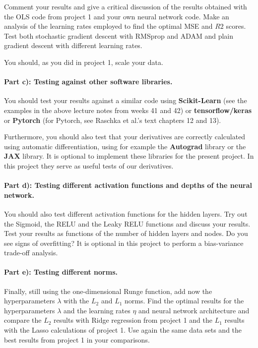 \documentclass[%
oneside,                 %
final,                   %
10pt]{article}
\begin{document}
Comment your results and give a critical discussion of the results
obtained with the OLS code from project 1 and your own neural network
code.  Make an analysis of the learning rates employed to find the
optimal MSE and $R2$ scores. Test both stochastic gradient descent
with RMSprop and ADAM and plain gradient descent with different
learning rates.

You should, as you did in project 1, scale your data.

\paragraph{Part c): Testing against other software libraries.}
You should test your results against a similar code using \textbf{Scikit-Learn} (see the examples in the above lecture notes from weeks 41 and 42) or \textbf{tensorflow/keras} or \textbf{Pytorch} (for Pytorch, see Raschka et al.'s text chapters 12 and 13). 

Furthermore, you should also test that your derivatives are correctly
calculated using automatic differentiation, using for example the
\textbf{Autograd} library or the \textbf{JAX} library. It is optional to implement
these libraries for the present project. In this project they serve as
useful tests of our derivatives.

\paragraph{Part d): Testing different activation functions and depths of the neural network.}
You should also test different activation functions for the hidden
layers. Try out the Sigmoid, the RELU and the Leaky RELU functions and
discuss your results.  Test your results as functions of the number of hidden layers and nodes. Do you see signs of overfitting?
It is optional in this project to perform a bias-variance trade-off analysis. 

\paragraph{Part e): Testing different norms.}
Finally, still using the one-dimensional Runge function, add now the
hyperparameters $\lambda$ with the $L_2$ and $L_1$ norms.  Find the
optimal results for the hyperparameters $\lambda$ and the learning
rates $\eta$ and neural network architecture and compare the $L_2$ results with Ridge regression from
project 1 and the $L_1$ results with the Lasso calculations of project 1.
Use again the same data sets and the best results from project 1 in your comparisons. 
\end{document}
